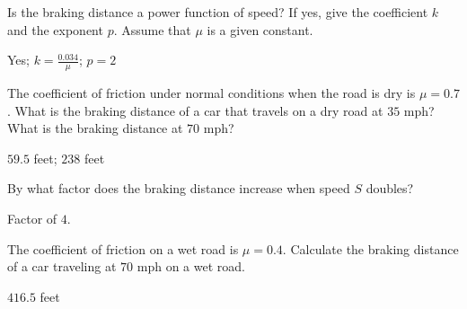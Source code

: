 \begin{exercise}
Is the braking distance a power function of speed? If yes, give the coefficient $k$ and the exponent $p$. Assume that $\mu$ is a given constant.
\end{exercise}

\begin{solution}
Yes; $k=\frac{0.034}{\mu}$; $p=2$
\end{solution}

\begin{exercise}
The coefficient of friction under normal conditions when the road is dry is $\mu=0.7$. What is the braking distance of a car that travels on a dry road at $35$ mph? What is the braking distance at $70$ mph?
\end{exercise}

\begin{solution}
$59.5$ feet; $238$ feet
\end{solution}

\begin{exercise}
By what factor does the braking distance increase when speed $S$ doubles?
\end{exercise}

\begin{solution}
Factor of $4$.
\end{solution}

\begin{exercise}
The coefficient of friction on a wet road is $\mu=0.4$. Calculate the braking distance of a car traveling at $70$ mph on a wet road.
\end{exercise}

\begin{solution}
$416.5$ feet
\end{solution}






